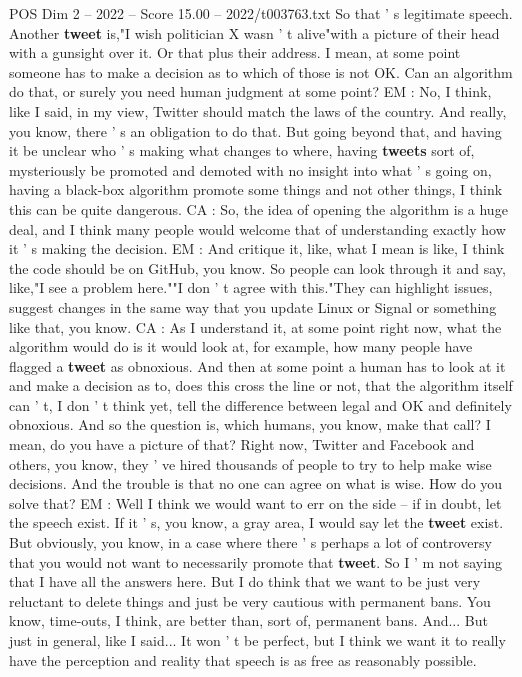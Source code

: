 \begin{textsample}{POS Dim 2 – 2022 – Score 15.00 – 2022/t003763.txt}
So that ' s legitimate speech.
Another \textbf{tweet} is,"I wish politician X wasn ' t alive"with a picture of their head with a gunsight over it.
Or that plus their address.
I mean, at some point someone has to make a decision as to which of those is not OK.
Can an algorithm do that, or surely you need human judgment at some point?
EM : No, I think, like I said, in my view, Twitter should match the laws of the country.
And really, you know, there ' s an obligation to do that.
But going beyond that, and having it be unclear who ' s making what changes to where, having \textbf{tweets} sort of, mysteriously be promoted and demoted with no insight into what ' s going on, having a black-box algorithm promote some things and not other things, I think this can be quite dangerous.
CA : So, the idea of opening the algorithm is a huge deal, and I think many people would welcome that of understanding exactly how it ' s making the decision.
EM : And critique it, like, what I mean is like, I think the code should be on GitHub, you know.
So people can look through it and say, like,"I see a problem here.""I don ' t agree with this."They can highlight issues, suggest changes in the same way that you update Linux or Signal or something like that, you know.
CA : As I understand it, at some point right now, what the algorithm would do is it would look at, for example, how many people have flagged a \textbf{tweet} as obnoxious.
And then at some point a human has to look at it and make a decision as to, does this cross the line or not, that the algorithm itself can ' t, I don ' t think yet, tell the difference between legal and OK and definitely obnoxious.
And so the question is, which humans, you know, make that call?
I mean, do you have a picture of that?
Right now, Twitter and Facebook and others, you know, they ' ve hired thousands of people to try to help make wise decisions.
And the trouble is that no one can agree on what is wise.
How do you solve that?
EM : Well I think we would want to err on the side -- if in doubt, let the speech exist.
If it ' s, you know, a gray area, I would say let the \textbf{tweet} exist.
But obviously, you know, in a case where there ' s perhaps a lot of controversy that you would not want to necessarily promote that \textbf{tweet}.
So I ' m not saying that I have all the answers here.
But I do think that we want to be just very reluctant to delete things and just be very cautious with permanent bans.
You know, time-outs, I think, are better than, sort of, permanent bans.
And...
But just in general, like I said...
It won ' t be perfect, but I think we want it to really have the perception and reality that speech is as free as reasonably possible.

\end{textsample}
